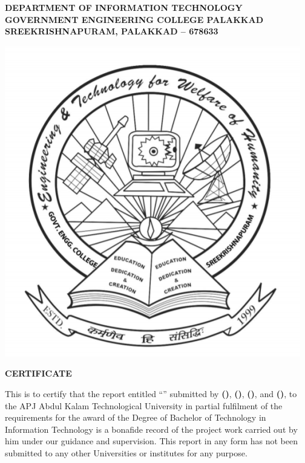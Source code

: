 \begin{titlepage}
\vfill
\begin{center}
    \textbf{
    DEPARTMENT OF INFORMATION TECHNOLOGY\\ 
    GOVERNMENT ENGINEERING COLLEGE PALAKKAD\\ 
    SREEKRISHNAPURAM, PALAKKAD – 678633
    }
    
    \vspace{1cm}
    
    \includegraphics[scale=0.3]{covers/images/logo_gecp.png}
    
    \vspace{1cm}
    
    \textbf{
        \Large{
            CERTIFICATE
        }
    }
    
\end{center}

\noindent This is to certify that the report entitled “\textbf{\cTitle}” submitted by \textbf{\MakeUppercase{\cMembOne} (\cMembOneRegNo)}, \textbf{\MakeUppercase{\cMembTwo} (\cMembTwoRegNo)}, \textbf{\MakeUppercase{\cMembThree} (\cMembThreeRegNo)}, and \textbf{\MakeUppercase{\cMembFour} (\cMembFourRegNo)},
to the APJ Abdul Kalam Technological University in partial fulfilment of the requirements for the award of the Degree of Bachelor of Technology in Information Technology is a bonafide record of the project work carried out by him under our guidance and supervision. This report in any form has not been submitted to any other Universities or institutes for any purpose.


\end{titlepage}
